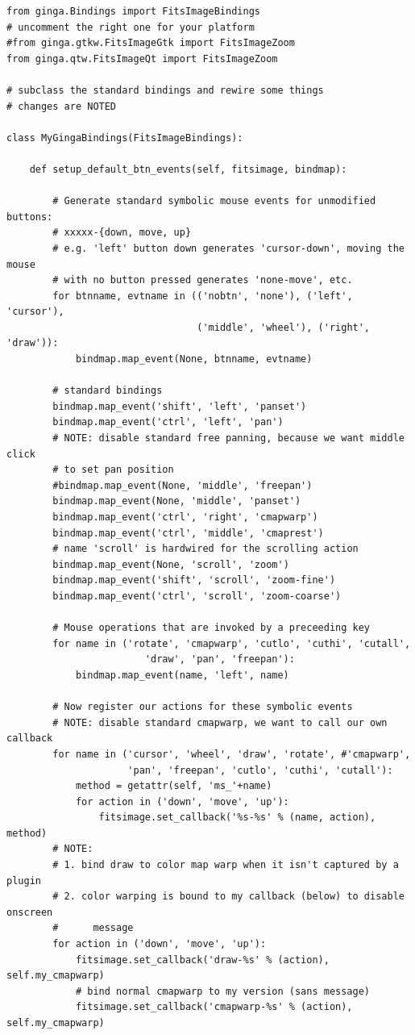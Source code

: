 \documentclass[11pt]{report}
\begin{document}
\begin{lstlisting}
from ginga.Bindings import FitsImageBindings
# uncomment the right one for your platform
#from ginga.gtkw.FitsImageGtk import FitsImageZoom
from ginga.qtw.FitsImageQt import FitsImageZoom

# subclass the standard bindings and rewire some things
# changes are NOTED

class MyGingaBindings(FitsImageBindings):

    def setup_default_btn_events(self, fitsimage, bindmap):

        # Generate standard symbolic mouse events for unmodified buttons:
        # xxxxx-{down, move, up}
        # e.g. 'left' button down generates 'cursor-down', moving the mouse
        # with no button pressed generates 'none-move', etc.
        for btnname, evtname in (('nobtn', 'none'), ('left', 'cursor'),
                                 ('middle', 'wheel'), ('right', 'draw')):
            bindmap.map_event(None, btnname, evtname)

        # standard bindings
        bindmap.map_event('shift', 'left', 'panset')
        bindmap.map_event('ctrl', 'left', 'pan')
        # NOTE: disable standard free panning, because we want middle click
        # to set pan position
        #bindmap.map_event(None, 'middle', 'freepan')
        bindmap.map_event(None, 'middle', 'panset')
        bindmap.map_event('ctrl', 'right', 'cmapwarp')
        bindmap.map_event('ctrl', 'middle', 'cmaprest')
        # name 'scroll' is hardwired for the scrolling action
        bindmap.map_event(None, 'scroll', 'zoom')
        bindmap.map_event('shift', 'scroll', 'zoom-fine')
        bindmap.map_event('ctrl', 'scroll', 'zoom-coarse')

        # Mouse operations that are invoked by a preceeding key
        for name in ('rotate', 'cmapwarp', 'cutlo', 'cuthi', 'cutall',
                        'draw', 'pan', 'freepan'):
            bindmap.map_event(name, 'left', name)

        # Now register our actions for these symbolic events
        # NOTE: disable standard cmapwarp, we want to call our own callback
        for name in ('cursor', 'wheel', 'draw', 'rotate', #'cmapwarp',
                     'pan', 'freepan', 'cutlo', 'cuthi', 'cutall'):
            method = getattr(self, 'ms_'+name)
            for action in ('down', 'move', 'up'):
                fitsimage.set_callback('%s-%s' % (name, action), method)
        # NOTE:
        # 1. bind draw to color map warp when it isn't captured by a plugin
        # 2. color warping is bound to my callback (below) to disable onscreen
        #      message
        for action in ('down', 'move', 'up'):
            fitsimage.set_callback('draw-%s' % (action), self.my_cmapwarp)
            # bind normal cmapwarp to my version (sans message)
            fitsimage.set_callback('cmapwarp-%s' % (action), self.my_cmapwarp)


\end{lstlisting}
\end{document}
